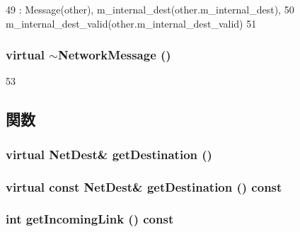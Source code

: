 \begin{DoxyCode}
49         : Message(other), m_internal_dest(other.m_internal_dest),
50           m_internal_dest_valid(other.m_internal_dest_valid)
51     { }
\end{DoxyCode}
\hypertarget{classNetworkMessage_a9c8193e762d7e9f7f3f123452ec3ec60}{
\subsubsection[{$\sim$NetworkMessage}]{\setlength{\rightskip}{0pt plus 5cm}virtual $\sim${\bf NetworkMessage} ()}}
\label{classNetworkMessage_a9c8193e762d7e9f7f3f123452ec3ec60}



\begin{DoxyCode}
53 { }
\end{DoxyCode}


\subsection{関数}
\hypertarget{classNetworkMessage_aaa314e104d7c6d36cd953561101bf9d9}{
\subsubsection[{getDestination}]{\setlength{\rightskip}{0pt plus 5cm}virtual {\bf NetDest}\& getDestination ()}}
\label{classNetworkMessage_aaa314e104d7c6d36cd953561101bf9d9}
\hypertarget{classNetworkMessage_a91cc7a52d7587251c22f3927054d6358}{
\subsubsection[{getDestination}]{\setlength{\rightskip}{0pt plus 5cm}virtual const {\bf NetDest}\& getDestination () const}}
\label{classNetworkMessage_a91cc7a52d7587251c22f3927054d6358}
\hypertarget{classNetworkMessage_a9fb12de930fd6ddbb84b321a70d5dc6f}{
\subsubsection[{getIncomingLink}]{\setlength{\rightskip}{0pt plus 5cm}int getIncomingLink () const}}
\label{classNetworkMessage_a9fb12de930fd6ddbb84b321a70d5dc6f}



